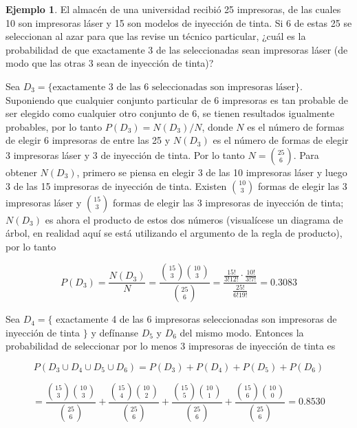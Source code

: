\documentclass[
  11pt,
]{book}
\theoremstyle{definition}
\theoremstyle{definition}
\newtheorem{example}{Ejemplo}[chapter]
\theoremstyle{definition}
\theoremstyle{definition}
\theoremstyle{remark}
\begin{document}
\begin{example}
El almacén de una universidad recibió 25 impresoras, de las cuales 10 son impresoras láser y 15 son modelos de inyección de tinta. Si 6 de estas 25 se seleccionan al azar para que las revise un técnico particular, ¿cuál es la probabilidad de que exactamente 3 de las seleccionadas sean impresoras láser (de modo que las otras 3 sean de inyección de tinta)?

Sea \(D_3 = \{\text{exactamente 3 de las 6 seleccionadas son impresoras láser}\}\). Suponiendo que cualquier conjunto particular de 6 impresoras es tan probable de ser elegido como cualquier otro conjunto de 6, se tienen resultados igualmente probables, por lo tanto \(P(D_3) = N(D_3)/N\), donde \(N\) es el número de formas de elegir 6 impresoras de entre las 25 y \(N(D_3)\) es el número de formas de elegir 3 impresoras láser y 3 de inyección de tinta. Por lo tanto \(N = \binom{25}{6}\). Para obtener \(N(D_3)\), primero se piensa en elegir 3 de las 10 impresoras láser y luego 3 de las 15 impresoras de inyección de tinta. Existen \(\binom{10}{3}\) formas de elegir las 3 impresoras láser y \(\binom{15}{3}\) formas de elegir las 3 impresoras de inyección de tinta; \(N(D_3)\) es ahora el producto de estos dos números (visualícese un diagrama de árbol, en realidad aquí se está utilizando el argumento de la regla de producto), por lo tanto

\[
P(D_3) = \frac{N(D_3)}{N} = \frac{\binom{15}{3}\binom{10}{3}}{\binom{25}{6}} = \frac{\frac{15!}{3!12!} \cdot \frac{10!}{3!7!}}{\frac{25!}{6!19!}} = 0.3083
\]

Sea \(D_4 = \{\) exactamente 4 de las 6 impresoras seleccionadas son impresoras de inyección de tinta \(\}\) y defínanse \(D_5\) y \(D_6\) del mismo modo. Entonces la probabilidad de seleccionar por lo menos 3 impresoras de inyección de tinta es

\[
P(D_3 \cup D_4 \cup D_5 \cup D_6) = P(D_3) + P(D_4) + P(D_5) + P(D_6)
\]

\[
= \frac{\binom{15}{3}\binom{10}{3}}{\binom{25}{6}} + \frac{\binom{15}{4}\binom{10}{2}}{\binom{25}{6}} + \frac{\binom{15}{5}\binom{10}{1}}{\binom{25}{6}} + \frac{\binom{15}{6}\binom{10}{0}}{\binom{25}{6}} = 0.8530
\]
\end{example}
\end{document}
